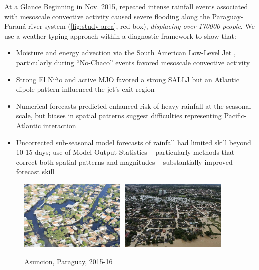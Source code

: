 \begin{block}{At a Glance}
  Beginning in Nov. 2015, repeated intense rainfall events associated with mesoscale convective activity caused severe flooding along the Paraguay-Paran\'{a} river system (\cref{fig:study-area}, red box), \emph{displacing over 170000 people}.
  We use a weather typing approach within a diagnostic framework to show that:
  \begin{itemize}
    \item Moisture and energy advection via the South American Low-Level Jet \cite[SALLJ;][]{Marengo:2012cm}, particularly during ``No-Chaco'' events \cite{Vera:2006ib} favored mesoscale convective activity
    \item Strong El Ni\~{n}o and active MJO favored a strong SALLJ but an Atlantic dipole pattern influenced the jet's exit region
    \item Numerical forecasts predicted enhanced risk of heavy rainfall at the seasonal scale, but biases in spatial patterns suggest difficulties representing Pacific-Atlantic interaction
    \item Uncorrected sub-seasonal model forecasts of rainfall had limited skill beyond 10-15 days; use of Model Output Statistics -- particularly methods that correct both spatial patterns and magnitudes -- substantially improved forecast skill
  \end{itemize}
  \begin{mdframed}
  \begin{figure}
  	\noindent\includegraphics[width=0.45\textwidth]{asuncion-inundaciones.jpg}~
    \noindent\includegraphics[width=0.45\textwidth]{rio-py-banados.jpg}
  	\caption{
  		Asuncion, Paraguay, 2015-16
  	}
    \label{fig:floods}
  \end{figure}
  \end{mdframed}
\end{block}

